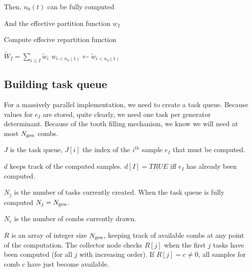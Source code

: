 \documentclass[./thesis.tex]{subfiles}
\newcommand{\Nteeth}{N_\text{teeth}}
\begin{document}
Then, $n_0(t)$ can be fully computed



And the effective partition function $w_I$

\begin{algorithm}
	\caption{Compute effecive repartition function}
	$\tilde W_I = \sum_{i \leq I} {\tilde w_i}$ \;
	$w_{i<n_0(1)} \gets \tilde w_{i<n_0(1)}$ \;
	
\end{algorithm}



\subsection{Building task queue}

For a massively parallel implementation, we need to create a task queue. Because values for $e_I$ are stored, quite clearly, we need one task per generator determinant. Because of the tooth filling mechanism, we know we will need at most ${N_\text{gen}}$ combs.
\begin{description}
\item{$J$} is the task queue, $J[i]$ the index of the $i^{th}$ sample $e_I$ that must be computed.
\item{$d$} keeps track of the computed samples. $d[I] = TRUE$ iff $e_I$ has already been computed.
\item{$N_j$} is the number of tasks currently created. When the task queue is fully computed $N_j = {N_\text{gen}}$.
\item{$N_c$} is the number of combs currently drawn.
\item{$R$} is an array of integer size ${N_\text{gen}}$, keeping track of available combs at any point of the computation. The collector node checks $R[j]$ when the first $j$ tasks have been computed (for all $j$ with increasing order). If $R[j] = c \neq 0$, all samples for comb $c$ have just become available. 
\end{description}
\end{document}
